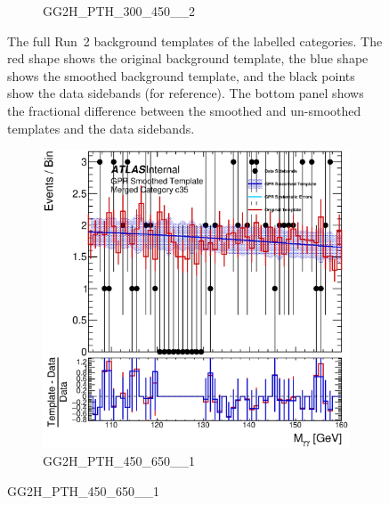 \begin{figure}
\begin{center}
\begin{subfigure}[T]{0.49\linewidth}
	\caption{GG2H\_PTH\_300\_450\_\_2}
\end{subfigure}
	\caption{The full Run~2 background templates of the labelled categories. The red shape shows the original background template, the blue shape shows the smoothed background template, and the black points show the data sidebands (for reference). The bottom panel shows the fractional difference between the smoothed and un-smoothed templates and the data sidebands. }
 \label{fig:gpr_coupcat_8}
 \end{center}
\end{figure}

\begin{figure}
\begin{center}
\begin{subfigure}[T]{0.49\linewidth}
	\centering
	\includegraphics[width=\linewidth]{figures/background/gpr/coupCatTemplates/GPR_Smoothed_Plot_hmgg_c35New.eps}
	\caption{GG2H\_PTH\_450\_650\_\_1}
\end{subfigure}

\end{center}
\end{figure}
